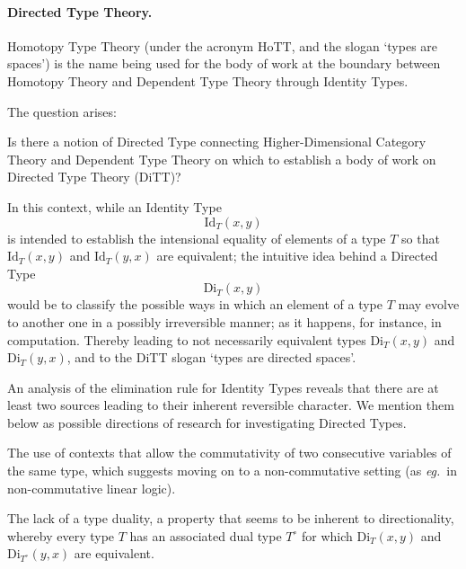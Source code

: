 \documentclass[11pt,twocolumn]{article}
\newcounter{CC}
\newenvironment{resenumerate}
  {\begin{list}{[\textbf{\arabic{CC}]}}
  {\usecounter{CC}
   \setlength{\topsep}{2pt}
   \setlength{\partopsep}{2pt}
   \setlength{\itemsep}{2.5pt}
   \setlength{\parsep}{2.5pt}
   \setlength{\leftmargin}{1.65em}
   \setlength{\labelwidth}{1.15em}
 }}
  {\end{list}}
\newcommand{\hide}[1]{}
\newcommand{\pref}[1]{\,(\ref{#1})}
\newcommand{\eg}{\emph{eg.}}
\newcommand{\Id}{\mathrm{Id}}
\newcommand{\Di}{\mathrm{Di}}
\begin{document}
\hide{
Finally, in an intriguing complementary direction,
Fiore~\cite{FioreFossacs} has suggested a graphical reading of the
Generalised Logical Calculus that is surprisingly close to formalisms for
categorical graphical languages~\cite{Selinger}, and
proof~\cite{GirardLinearLogic}/interaction~\cite{Lafont} nets.  This
aspect deserves investigation.
}

\paragraph{Directed Type Theory.}
\label{DirectedTypeTheoryParagraph}

Homotopy Type Theory (under the acronym HoTT, and the slogan `types are
spaces') is the name being used for the body of work at the boundary between
Homotopy Theory and Dependent Type Theory through Identity Types.

The question arises:
\begin{resenumerate}\setcounter{CC}{0}
\item
  Is there a notion of Directed Type connecting Higher-Dimensional Category
  Theory and Dependent Type Theory on which to establish a body of work on
  Directed Type Theory (DiTT)?
\end{resenumerate}
In this context, while an Identity Type
  \[
  \Id_T(x,y)
\]
is intended to establish the intensional equality of elements of a type $T$ so
that $\Id_T(x,y)$ and $\Id_T(y,x)$ are equivalent; the intuitive idea behind a
Directed Type 
  \[
  \Di_T(x,y)
\]
would be to classify the possible ways in which an element of a type $T$ may
evolve to another one in a possibly irreversible manner; as it happens, for
instance, in computation.  Thereby leading to not necessarily equivalent types
$\Di_T(x,y)$ and $\Di_T(y,x)$, and to the DiTT slogan `types are directed
spaces'.

An analysis of the elimination rule for Identity Types reveals that there
are at least two sources leading to their inherent reversible character.
We mention them below as possible directions of research for investigating
Directed Types.
\begin{resenumerate}\setcounter{CC}{1}
\item
  The use of contexts that allow the commutativity of two consecutive
  variables of the same type, which suggests moving on to a non-commutative
  setting (as \eg~in non-commutative linear logic).

\item\label{TypeDualityItem}
  The lack of a type duality, a property that seems to be inherent to
  directionality, whereby every type $T$ has an associated dual type $T^\circ$
  for which $\Di_T(x,y)$ and $\Di_{T^\circ}(y,x)$ are equivalent.  
\end{resenumerate}
\end{document}
